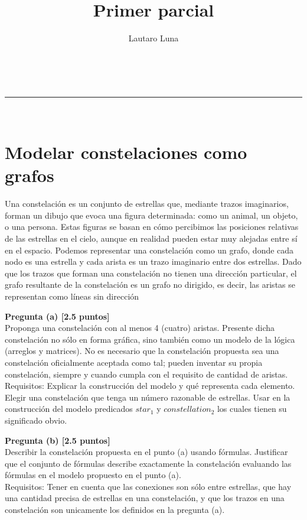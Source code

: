 \documentclass[a4paper,11pt]{article}
\makeatletter
\newcommand{\linia}{\rule{\linewidth}{0.5pt}}
\renewcommand{\maketitle}{
\begin{center}
\vspace{2ex}
{\Large \textsc{\@title}}
\vspace{1ex}
\\
\linia\\
\@author \hfill \@date
\vspace{4ex}
\end{center}
}
\makeatother
\begin{document}
\title{Primer parcial}

\author{Lautaro Luna}

\date{}

\maketitle

\vspace*{-1cm}

\section*{Modelar constelaciones como grafos}
Una constelación es un conjunto de estrellas que, mediante trazos imaginarios, forman un dibujo que
evoca una figura determinada: como un animal, un objeto, o una persona. Estas figuras se basan en
cómo percibimos las posiciones relativas de las estrellas en el cielo, aunque en realidad pueden estar muy
alejadas entre sí en el espacio. Podemos representar una constelación como un grafo, donde cada nodo
es una estrella y cada arista es un trazo imaginario entre dos estrellas. Dado que los trazos que forman
una constelación no tienen una dirección particular, el grafo resultante de la constelación es un grafo no
dirigido, es decir, las aristas se representan como líneas sin dirección


\textbf{Pregunta (a) [2.5 puntos]} \\
Proponga una constelación con al menos 4 (cuatro) aristas. Presente dicha constelación no sólo en
forma gráfica, sino también como un modelo de la lógica (arreglos y matrices). No es necesario que la
constelación propuesta sea una constelación oficialmente aceptada como tal; pueden inventar su propia
constelación, siempre y cuando cumpla con el requisito de cantidad de aristas. \\
Requisitos: Explicar la construcción del modelo y qué representa cada elemento. Elegir una constelación
que tenga un número razonable de estrellas. Usar en la construcción del modelo predicados $star_1$ y
$constellation_2$ los cuales tienen su significado obvio.

\textbf{Pregunta (b) [2.5 puntos]} \\
Describir la constelación propuesta en el punto (a) usando fórmulas. Justificar que el conjunto de fórmulas
describe exactamente la constelación evaluando las fórmulas en el modelo propuesto en el punto (a). \\
Requisitos: Tener en cuenta que las conexiones son sólo entre estrellas, que hay una cantidad precisa
de estrellas en una constelación, y que los trazos en una constelación son unicamente los definidos en la
pregunta (a).
\end{document}
